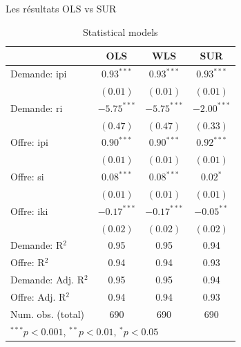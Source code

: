 \documentclass[11pt,ignorenonframetext,]{beamer}
\begin{document}
\begin{frame}{Les résultats OLS vs SUR}
\protect\hypertarget{les-resultats-ols-vs-sur}{}

\tiny

\begin{table}
\begin{center}
\begin{tabular}{l c c c }
\hline
 & OLS & WLS & SUR \\
\hline
Demande: ipi        & $0.93^{***}$  & $0.93^{***}$  & $0.93^{***}$  \\
                    & $(0.01)$      & $(0.01)$      & $(0.01)$      \\
Demande: ri         & $-5.75^{***}$ & $-5.75^{***}$ & $-2.00^{***}$ \\
                    & $(0.47)$      & $(0.47)$      & $(0.33)$      \\
Offre: ipi          & $0.90^{***}$  & $0.90^{***}$  & $0.92^{***}$  \\
                    & $(0.01)$      & $(0.01)$      & $(0.01)$      \\
Offre: si           & $0.08^{***}$  & $0.08^{***}$  & $0.02^{*}$    \\
                    & $(0.01)$      & $(0.01)$      & $(0.01)$      \\
Offre: iki          & $-0.17^{***}$ & $-0.17^{***}$ & $-0.05^{**}$  \\
                    & $(0.02)$      & $(0.02)$      & $(0.02)$      \\
\hline
Demande: R$^2$      & 0.95          & 0.95          & 0.94          \\
Offre: R$^2$        & 0.94          & 0.94          & 0.93          \\
Demande: Adj. R$^2$ & 0.95          & 0.95          & 0.94          \\
Offre: Adj. R$^2$   & 0.94          & 0.94          & 0.93          \\
Num. obs. (total)   & 690           & 690           & 690           \\
\hline
\multicolumn{4}{l}{\scriptsize{$^{***}p<0.001$, $^{**}p<0.01$, $^*p<0.05$}}
\end{tabular}
\caption{Statistical models}
\label{table : ols, wls and sur}
\end{center}
\end{table}
\tiny

\end{frame}
\end{document}
